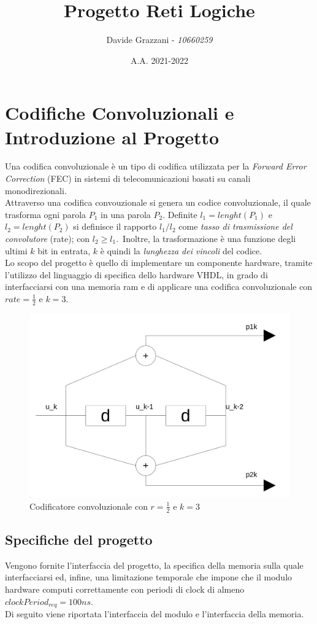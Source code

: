 \documentclass[11pt,a4paper]{article}
\author{\huge Davide Grazzani - \textit{10660259}}
\title{\fontsize{40}{48}\selectfont Progetto Reti Logiche}
\date{A.A. 2021-2022}
\begin{document}
    \maketitle
    \newpage

    \tableofcontents
    \newpage

    \section{Codifiche Convoluzionali e Introduzione al Progetto}
    Una codifica convoluzionale è un tipo di codifica utilizzata per la \textit{Forward Error Correction} (FEC) in sistemi di telecomunicazioni basati su canali monodirezionali. \\
    Attraverso una codifica convouzionale si genera un codice convoluzionale, il quale trasforma ogni parola $P_1$ in una parola $P_2$. Definite $l_1 = lenght(P_1)$ e $l_2 = lenght(P_2)$ si definisce il rapporto $l_1/l_2$ come \textit{tasso di trasmissione del convolutore} (rate); con $l_2 \geq l_1$.\
    Inoltre, la trasformazione è una funzione degli ultimi $k$ bit in entrata, $k$ è quindi la \textit{lunghezza dei vincoli} del codice.\\
    Lo scopo del progetto è quello di implementare un componente hardware, tramite l'utilizzo del linguaggio di specifica dello hardware VHDL, in grado di interfacciarsi con una memoria ram e di applicare una codifica convoluzionale con $rate = \frac{1}{2}$ e $k = 3$.
    \begin{figure}[h]
        \centering
        \includegraphics[width = 0.5\linewidth]{convolutore_image.png}
        \caption{Codificatore convoluzionale con $r = \frac{1}{2}$ e $k = 3$}
        \label{codificatore_convoluzionale_image}
    \end{figure}
    \subsection{Specifiche del progetto}
        Vengono fornite l'interfaccia del progetto, la specifica della memoria sulla quale interfacciarsi ed, infine, una limitazione temporale che impone che il modulo hardware computi correttamente con periodi di clock di almeno $clockPeriod_{req} = 100ns$.\\
        Di seguito viene riportata l'interfaccia del modulo e l'interfaccia della memoria.
\end{document}
